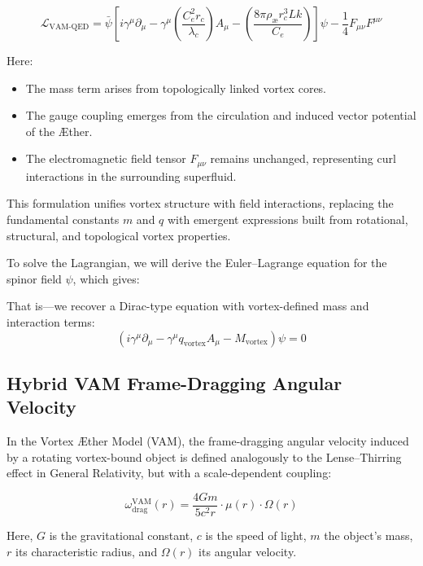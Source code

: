 \begin{equation}
 \mathcal{L}_{\text{VAM-QED}} =
\bar{\psi} \left[ i \gamma^\mu \partial_\mu
               - \gamma^\mu \left( \frac{C_e^2 r_c}{\lambda_c} \right) A_\mu
               - \left( \frac{8\pi \rho_{\text{\ae}} r_c^3 Lk}{C_e} \right) \right] \psi
- \frac{1}{4} F_{\mu\nu} F^{\mu\nu}
\end{equation}

Here:
\begin{itemize}
\item The mass term arises from topologically linked vortex cores.
\item The gauge coupling emerges from the circulation and induced vector potential of the \AE ther.
\item The electromagnetic field tensor \( F_{\mu\nu} \) remains unchanged, representing curl interactions in the surrounding superfluid.
\end{itemize}
This formulation unifies vortex structure with field interactions, replacing the fundamental constants \( m \) and \( q \) with emergent expressions built from rotational, structural, and topological vortex properties.

To solve the Lagrangian, we will derive the Euler--Lagrange equation for the spinor field \( \psi \), which gives:

That is—we recover a Dirac-type equation with vortex-defined mass and interaction terms:
\begin{equation}
    \boxed{ \left( i \gamma^\mu \partial_\mu - \gamma^\mu q_{\text{vortex}} A_\mu - M_{\text{vortex}} \right)\psi = 0}
\end{equation}

\subsection*{Hybrid VAM Frame-Dragging Angular Velocity}

In the Vortex Æther Model (VAM), the frame-dragging angular velocity induced by a rotating vortex-bound object is defined analogously to the Lense--Thirring effect in General Relativity, but with a scale-dependent coupling:

\begin{equation}
    \omega_{\text{drag}}^{\text{VAM}}(r) =
    \frac{4 G m}{5 c^2 r} \cdot \mu(r) \cdot \Omega(r)
\end{equation}

Here, \( G \) is the gravitational constant, \( c \) is the speed of light, \( m \) the object's mass, \( r \) its characteristic radius, and \( \Omega(r) \) its angular velocity.

